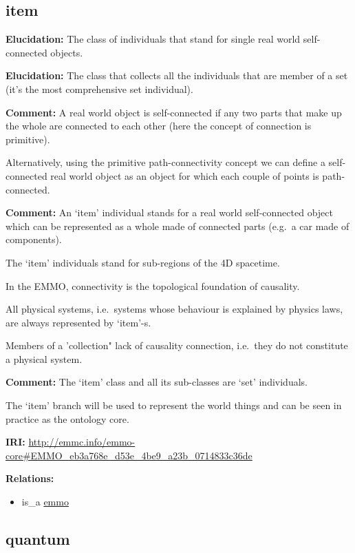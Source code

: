 \documentclass[a4paper,]{report}
\providecommand{\tightlist}{%
  \setlength{\itemsep}{0pt}\setlength{\parskip}{0pt}}
\begin{document}
\hypertarget{item}{%
\subsection{item}\label{item}}

\textbf{Elucidation:} The class of individuals that stand for single
real world self-connected objects.

\textbf{Elucidation:} The class that collects all the individuals that
are member of a set (it's the most comprehensive set individual).

\textbf{Comment:} A real world object is self-connected if any two parts
that make up the whole are connected to each other (here the concept of
connection is primitive).

Alternatively, using the primitive path-connectivity concept we can
define a self-connected real world object as an object for which each
couple of points is path-connected.

\textbf{Comment:} An `item' individual stands for a real world
self-connected object which can be represented as a whole made of
connected parts (e.g.~a car made of components).

The `item' individuals stand for sub-regions of the 4D spacetime.

In the EMMO, connectivity is the topological foundation of causality.

All physical systems, i.e.~systems whose behaviour is explained by
physics laws, are always represented by `item'-s.

Members of a 'collection" lack of causality connection, i.e.~they do not
constitute a physical system.

\textbf{Comment:} The `item' class and all its sub-classes are `set'
individuals.

The `item' branch will be used to represent the world things and can be
seen in practice as the ontology core.

\textbf{IRI:}
\url{http://emmc.info/emmo-core\#EMMO_eb3a768e_d53e_4be9_a23b_0714833c36de}

\textbf{Relations:}

\begin{itemize}
\tightlist
\item
  is\_a \protect\hyperlink{emmo}{emmo}
\end{itemize}

\hypertarget{quantum}{%
\subsection{quantum}\label{quantum}}
\end{document}
